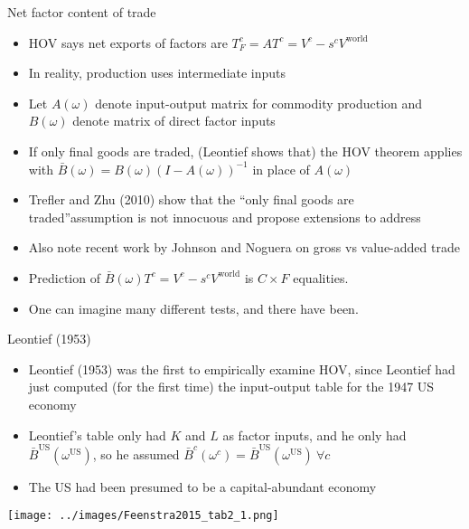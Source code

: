 \documentclass[10pt,notes=hide]{beamer}
\begin{document}
\begin{frame}{Net factor content of trade}
\begin{itemize}
	\item HOV says net exports of factors are
	$T_{F}^{c} = AT^c  = V^c - s^c V^{\text{world}}$
	\item In reality, production uses intermediate inputs
	\item Let $A(\omega)$ denote input-output matrix for commodity production and $B(\omega)$ denote matrix of direct factor inputs
	\item If only final goods are traded, (Leontief shows that)
	the HOV theorem applies with $\bar{B}(\omega) = B(\omega)\left(I-A(\omega)\right)^{-1}$ in place of $A(\omega)$
	\item Trefler and Zhu (2010) show that the ``only final goods are traded''assumption is not innocuous and propose extensions to address
	\item Also note recent work by Johnson and Noguera on gross vs value-added trade
	\item Prediction of $\bar{B}(\omega) T^c  = V^c - s^c V^{\text{world}}$ is $C \times F$ equalities.
	\item One can imagine many different tests, and there have been.
\end{itemize}
\end{frame}
\begin{frame}{Leontief (1953)}
\begin{itemize}
	\item Leontief (1953) was the first to empirically examine HOV,
	since Leontief had just computed (for the first time) the input-output table for the 1947 US economy
	\item Leontief's table only had $K$ and $L$ as factor inputs, and he only had $\bar{B}^{\text{US}}(\omega^{\text{US}})$,
	so he assumed $\bar{B}^c(\omega^c) = \bar{B}^{\text{US}}(\omega^{\text{US}}) \ \forall c$
	\item The US had been presumed to be a capital-abundant economy
\end{itemize}
\texttt{[image: ../images/Feenstra2015\_tab2\_1.png]}
\end{frame}
\end{document}
